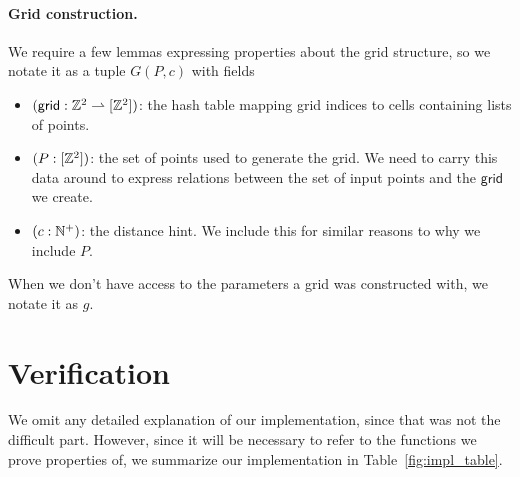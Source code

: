 \documentclass{article}
\begin{document}
\paragraph{Grid construction.}
We require a few lemmas expressing properties about the grid structure, so we notate it as a tuple $G(P, c)$ with fields
\begin{itemize}
  \item $(\mathsf{grid} : \mathbb{Z}^2 \rightharpoonup [\mathbb{Z}^2])$: the hash table mapping grid indices to cells containing lists of points.
  \item $(P : [\mathbb{Z}^2])$: the set of points used to generate the grid.
  We need to carry this data around to express relations between the set of input points and the $\mathsf{grid}$ we create.
  \item $(c : \mathbb{N}^+)$: the distance hint.
  We include this for similar reasons to why we include $P$.
\end{itemize}
When we don't have access to the parameters a grid was constructed with, we notate it as $g$.




\section{Verification}
We omit any detailed explanation of our implementation, since that was not the difficult part.
However, since it will be necessary to refer to the functions we prove properties of, we summarize our implementation in Table~\ref{fig:impl_table}.
\end{document}

